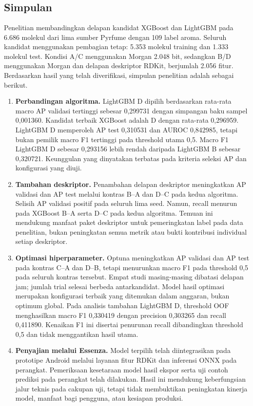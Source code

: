 \chapter{\kesimpulan}

\section{Simpulan}
Penelitian membandingkan delapan kandidat XGBoost dan LightGBM pada 6.686 molekul dari lima sumber Pyrfume dengan 109 label aroma. Seluruh kandidat menggunakan pembagian tetap: 5.353 molekul training dan 1.333 molekul test. Kondisi A/C menggunakan Morgan 2.048 bit, sedangkan B/D menggunakan Morgan dan delapan deskriptor RDKit, berjumlah 2.056 fitur. Berdasarkan hasil yang telah diverifikasi, simpulan penelitian adalah sebagai berikut.

\begin{enumerate}
    \item \textbf{Perbandingan algoritma.} LightGBM D dipilih berdasarkan rata-rata macro AP validasi tertinggi sebesar 0,299731 dengan simpangan baku sampel 0,001360. Kandidat terbaik XGBoost adalah D dengan rata-rata 0,296959. LightGBM D memperoleh AP test 0,310531 dan AUROC 0,842985, tetapi bukan pemilik macro F1 tertinggi pada threshold utama 0,5. Macro F1 LightGBM D sebesar 0,293156 lebih rendah daripada LightGBM B sebesar 0,320721. Keunggulan yang dinyatakan terbatas pada kriteria seleksi AP dan konfigurasi yang diuji.
    \item \textbf{Tambahan deskriptor.} Penambahan delapan deskriptor meningkatkan AP validasi dan AP test melalui kontras B--A dan D--C pada kedua algoritma. Selisih AP validasi positif pada seluruh lima seed. Namun, recall menurun pada XGBoost B--A serta D--C pada kedua algoritma. Temuan ini mendukung manfaat paket deskriptor untuk pemeringkatan label pada data penelitian, bukan peningkatan semua metrik atau bukti kontribusi individual setiap deskriptor.
    \item \textbf{Optimasi hiperparameter.} Optuna meningkatkan AP validasi dan AP test pada kontras C--A dan D--B, tetapi menurunkan macro F1 pada threshold 0,5 pada seluruh kontras tersebut. Empat studi masing-masing dibatasi delapan jam; jumlah trial selesai berbeda antarkandidat. Model hasil optimasi merupakan konfigurasi terbaik yang ditemukan dalam anggaran, bukan optimum global. Pada analisis tambahan LightGBM D, threshold OOF menghasilkan macro F1 0,330419 dengan precision 0,303265 dan recall 0,411890. Kenaikan F1 ini disertai penurunan recall dibandingkan threshold 0,5 dan tidak menggantikan hasil utama.
    \item \textbf{Penyajian melalui Essenza.} Model terpilih telah diintegrasikan pada prototipe Android melalui layanan fitur RDKit dan inferensi ONNX pada perangkat. Pemeriksaan kesetaraan model hasil ekspor serta uji contoh prediksi pada perangkat telah dilakukan. Hasil ini mendukung keberfungsian jalur teknis pada cakupan uji, tetapi tidak membuktikan peningkatan kinerja model, manfaat bagi pengguna, atau kesiapan produksi.
\end{enumerate}

